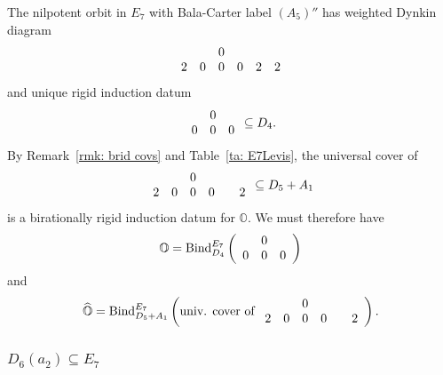 \documentclass[11pt]{amsart}
\renewcommand{\O}{{\mathbb O}}
\newcommand{\BInd}{{{\mbox{\rm Bind}}}}
\newcommand{\hatO}{\widehat{\O}}
\numberwithin{equation}{section}
\begin{document}
	The nilpotent orbit in $E_7$ with Bala-Carter label $(A_5)''$ has weighted Dynkin diagram $$\begin{array}{c c c c c c}
		& & 0 & & & \\
		2 & 0 & 0 & 0 & 2 & 2 \\
	\end{array}$$ and unique rigid induction datum
	$$\begin{array}{c c c}
		& 0 & \\
		0 & 0 & 0  \\
	\end{array}\subseteq D_4.$$
	By Remark~\ref{rmk: brid covs} and Table~\ref{ta: E7Levis}, the universal cover of $$\begin{array}{c c c c c c}
		& & 0 & & & \\
		2 & 0 & 0 & 0 & & 2 \\
	\end{array}\subseteq D_5+A_1$$ is a birationally rigid induction datum for $\O$. We must therefore have
	$$\O = \BInd_{D_4}^{E_7}\left(\begin{array}{c c c}
		& 0 & \\
		0 & 0 & 0  \\
	\end{array} \right)$$
	and
	$$\hatO = \BInd_{D_5+ A_1}^{E_7}\left( \mbox{univ. cover of }\begin{array}{c c c c c c}
		& & 0 & & & \\
		2 & 0 & 0 & 0 & & 2 \\
	\end{array} \right).$$
	
	
	\subsubsection{\texorpdfstring{$D_6(a_2)\subseteq E_7$}{D6a2 in E6}}\label{sss: D6a2 in E6}
	
\end{document}
